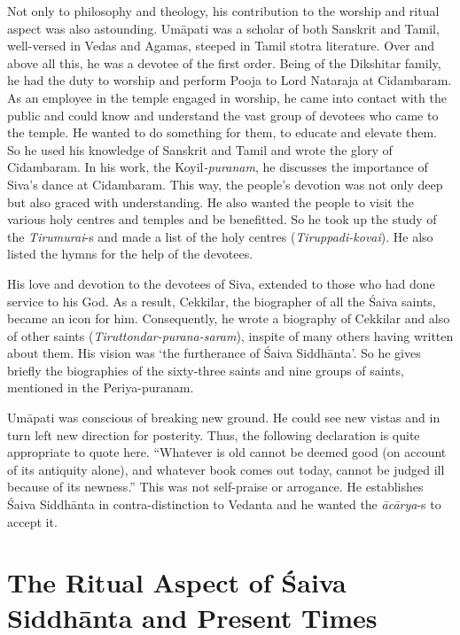 Not only to philosophy and theology, his contribution to the worship and ritual aspect was also astounding. Umāpati was a scholar of both Sanskrit and Tamil, well-versed in Vedas and Agamas, steeped in Tamil stotra literature. Over and above all this, he was a devotee of the first order. Being of the Dikshitar family, he had the duty to worship and perform Pooja to Lord Nataraja at Cidambaram. As an employee in the temple engaged in worship, he came into contact with the public and could know and understand the vast group of devotees who came to the temple. He wanted to do something for them, to educate and elevate them. So he used his knowledge of Sanskrit and Tamil and wrote the glory of Cidambaram. In his work, the Koyil\textit{-puranam}, he discusses the importance of Siva’s dance at Cidambaram. This way, the people’s devotion was not only deep but also graced with understanding. He also wanted the people to visit the various holy centres and temples and be benefitted. So he took up the study of the \textit{Tirumurai}-s and made a list of the holy centres (\textit{Tiruppadi-kovai}). He also listed the hymns for the help of the devotees.

His love and devotion to the devotees of Siva, extended to those who had done service to his God. As a result, Cekkilar, the biographer of all the Śaiva saints, became an icon for him. Consequently, he wrote a biography of Cekkilar and also of other saints (\textit{Tiruttondar-purana-saram}), inspite of many others having written about them. His vision was ‘the furtherance of Śaiva Siddhānta’. So he gives briefly the biographies of the sixty-three saints and nine groups of saints, mentioned in the Periya-puranam.

Umāpati was conscious of breaking new ground. He could see new vistas and in turn left new direction for posterity. Thus, the following declaration is quite appropriate to quote here. “Whatever is old cannot be deemed good (on account of its antiquity alone), and whatever book comes out today, cannot be judged ill because of its newness.” This was not self-praise or arrogance. He establishes Śaiva Siddhānta in contra-distinction to Vedanta and he wanted the \textit{ācārya}-s to accept it.


\section{The Ritual Aspect of Śaiva Siddhānta and Present Times}

